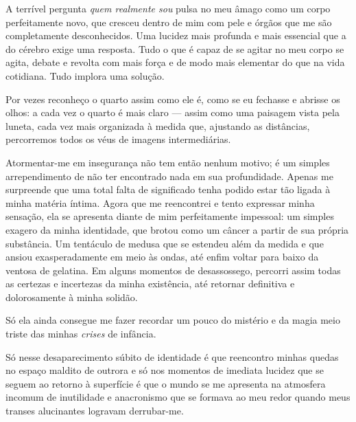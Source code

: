 A terrível pergunta \textit{quem realmente sou} pulsa no meu âmago como um
corpo perfeitamente novo, que cresceu dentro de mim com pele e órgãos que me
são completamente desconhecidos. Uma lucidez mais profunda e mais essencial
que a do cérebro exige uma resposta. Tudo o que é capaz de se agitar no meu
corpo se agita, debate e revolta com mais força e de modo mais elementar do
que na vida cotidiana. Tudo implora uma solução.

Por vezes reconheço o quarto assim como ele é, como se eu fechasse e abrisse
os olhos: a cada vez o quarto é mais claro --- assim como uma paisagem vista
pela luneta, cada vez mais organizada à medida que, ajustando as distâncias,
percorremos todos os véus de imagens intermediárias.


Atormentar-me em insegurança não tem então nenhum motivo; é um simples
arrependimento de não ter encontrado nada em sua profundidade. Apenas me
surpreende que uma total falta de significado tenha podido estar tão ligada à
minha matéria íntima. Agora que me reencontrei e tento expressar minha
sensação, ela se apresenta diante de mim perfeitamente impessoal: um simples
exagero da minha identidade, que brotou como um câncer a partir de sua
própria substância. Um tentáculo de medusa que se estendeu além da medida e
que ansiou exasperadamente em meio às ondas, até enfim voltar para baixo da
ventosa de gelatina. Em alguns momentos de desassossego, percorri assim todas
as certezas e incertezas da minha existência, até retornar definitiva e
dolorosamente à minha solidão.


Só ela ainda consegue me fazer recordar um pouco do mistério e da magia meio
triste das minhas \textit{crises} de infância.

Só nesse desaparecimento súbito de identidade é que reencontro minhas quedas
no espaço maldito de outrora e só nos momentos de imediata lucidez que se
seguem ao retorno à superfície é que o mundo se me apresenta na atmosfera
incomum de inutilidade e anacronismo que se formava ao meu redor quando meus
transes alucinantes logravam derrubar-me.


